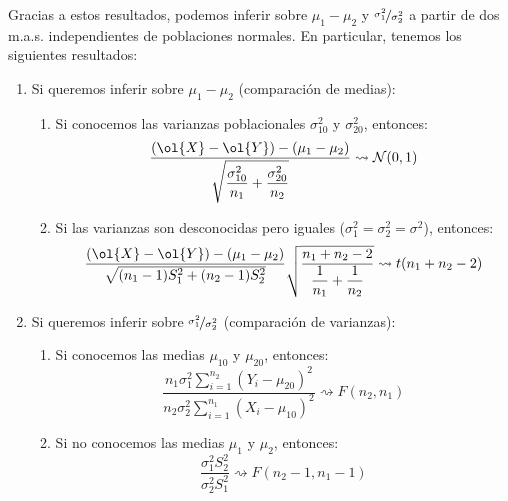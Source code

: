 Gracias a estos resultados, podemos inferir sobre $\mu_1 - \mu_2$ y $\nicefrac{\sigma_1^2}{\sigma_2^2}$ a partir de dos m.a.s. independientes de poblaciones normales. En particular, tenemos los siguientes resultados:
\begin{enumerate}
    \item Si queremos inferir sobre $\mu_1 - \mu_2$ (comparación de medias):
    \begin{enumerate}
        \item Si conocemos las varianzas poblacionales $\sigma_{10}^2$ y $\sigma_{20}^2$, entonces:
        \begin{equation*}
            \dfrac{(\ol{X} - \ol{Y}) - (\mu_1 - \mu_2)}{\sqrt{\dfrac{\sigma_{10}^2}{n_1} + \dfrac{\sigma_{20}^2}{n_2}}} \rightsquigarrow \cc{N}(0,1)
        \end{equation*}

        \item Si las varianzas son desconocidas pero iguales ($\sigma_1^2 = \sigma_2^2 = \sigma^2$), entonces:
        \begin{equation*}
            \dfrac{(\ol{X} - \ol{Y}) - (\mu_1 - \mu_2)}{\sqrt{(n_1 - 1)S_1^2 + (n_2 - 1)S_2^2}} \sqrt{\dfrac{n_1 + n_2 - 2}{\dfrac{1}{n_1} + \dfrac{1}{n_2}}} \rightsquigarrow t(n_1 + n_2 - 2)
        \end{equation*}
    \end{enumerate}

    \item Si queremos inferir sobre $\nicefrac{\sigma_1^2}{\sigma_2^2}$ (comparación de varianzas):
    \begin{enumerate}
        \item Si conocemos las medias $\mu_{10}$ y $\mu_{20}$, entonces:
        \begin{equation*}
            \dfrac{n_1 \sigma_1^2 \sum\limits_{i=1}^{n_2} {(Y_i - \mu_{20})}^{2}}{n_2 \sigma_2^2 \sum\limits_{i=1}^{n_1} {(X_i - \mu_{10})}^{2}} \rightsquigarrow F(n_2, n_1)
        \end{equation*}

        \item Si no conocemos las medias $\mu_1$ y $\mu_2$, entonces:
        \begin{equation*}
            \dfrac{\sigma_1^2 S_2^2}{\sigma_2^2 S_1^2} \rightsquigarrow F(n_2 - 1, n_1 - 1)
        \end{equation*}
    \end{enumerate}
\end{enumerate}

